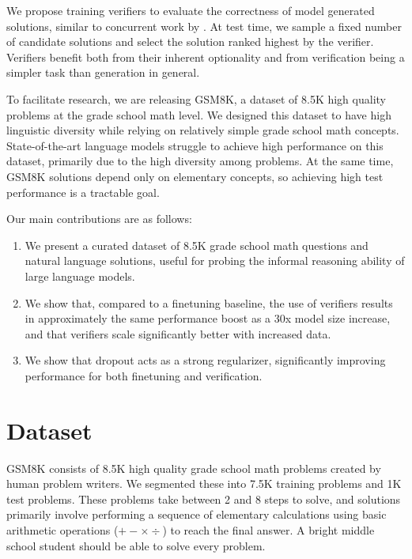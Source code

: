 We propose training verifiers to evaluate the correctness of model generated solutions, similar to concurrent work by \cite{shen2021generate}. At test time, we sample a fixed number of candidate solutions and select the solution ranked highest by the verifier. Verifiers benefit both from their inherent optionality and from verification being a simpler task than generation in general.

To facilitate research, we are releasing GSM8K, a dataset of 8.5K high quality problems at the grade school math level. We designed this dataset to have high linguistic diversity while relying on relatively simple grade school math concepts. State-of-the-art language models struggle to achieve high performance on this dataset, primarily due to the high diversity among problems. At the same time, GSM8K solutions depend only on elementary concepts, so achieving high test performance is a tractable goal.

Our main contributions are as follows:

\begin{enumerate}
\item We present a curated dataset of 8.5K grade school math questions and natural language solutions, useful for probing the informal reasoning ability of large language models.

\item We show that, compared to a finetuning baseline, the use of verifiers results in approximately the same performance boost as a 30x model size increase, and that verifiers scale significantly better with increased data.

\item We show that dropout acts as a strong regularizer, significantly improving performance for both finetuning and verification.
\end{enumerate}

\section{Dataset} \label{section:dataset}

GSM8K consists of 8.5K high quality grade school math problems created by human problem writers. We segmented these into 7.5K training problems and 1K test problems. These problems take between 2 and 8 steps to solve, and solutions primarily involve performing a sequence of elementary calculations using basic arithmetic operations ($+ - \times \div$) to reach the final answer. A bright middle school student should be able to solve every problem.

